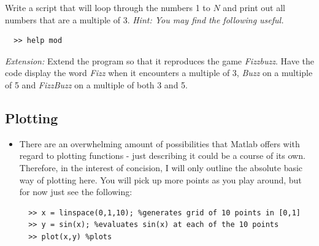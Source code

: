 \documentclass[12pt]{report}
\begin{document}
\begin{tcolorbox}[title=Task]
  Write a script that will loop through the numbers 1 to $N$ and print out all numbers that are a multiple of 3. \newline
  \textit{Hint: You may find the following useful.}
  \begin{lstlisting}
  >> help mod
  \end{lstlisting}
  \tcblower
  \textit{Extension:} Extend the program so that it reproduces the game \textit{Fizzbuzz}. Have the code display the word \textit{Fizz} when it encounters a multiple of 3, \textit{Buzz} on a multiple of 5 and \textit{FizzBuzz} on a multiple of both 3 and 5.
\end{tcolorbox}


\subsection*{Plotting}
\begin{itemize}
\item There are an overwhelming amount of possibilities that Matlab offers with regard to plotting functions - just describing it could be a course of its own. Therefore, in the interest of concision, I will only outline the absolute basic way of plotting here. You will pick up more points as you play around, but for now just see the following:
\begin{lstlisting}
  >> x = linspace(0,1,10); %generates grid of 10 points in [0,1]
  >> y = sin(x); %evaluates sin(x) at each of the 10 points 
  >> plot(x,y) %plots
\end{lstlisting}
\end{itemize}
\end{document}

